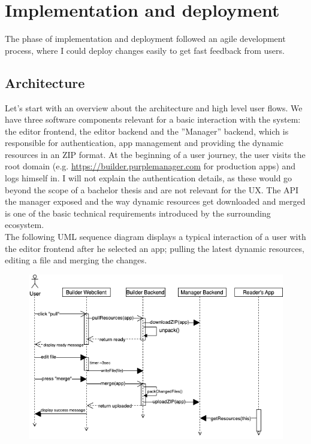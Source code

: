 
%
\chapter{Implementation and deployment}
\label{chap:impl} 

The phase of implementation and deployment followed an agile development process, where I could deploy changes easily to get fast feedback from users.


\section{Architecture}

Let's start with an overview about the architecture and high level user flows.
We have three software components relevant for a basic interaction with the system: the editor frontend, the editor backend and the ''Manager'' backend, which is responsible for
authentication, app management and providing the dynamic resources in an ZIP format.
At the beginning of a user journey, the user visits the root domain (e.g. \url{https://builder.purplemanager.com} for production apps) and logs himself in.
I will not explain the authentication details, as these would go beyond the scope of a bachelor thesis and are not relevant for the UX.
The API the manager exposed and the way dynamic resources get downloaded and merged is one of the basic technical requirements introduced by the surrounding ecosystem.
\\
The following UML sequence diagram displays a typical interaction of a user with the editor frontend after he selected an app; pulling the latest dynamic resources, editing a file and merging the changes.
\begin{figure}[h!]
  \includegraphics[width=\textwidth]{pics/user-flow.uml.drawio.png}
\end{figure}
\pagebreak
